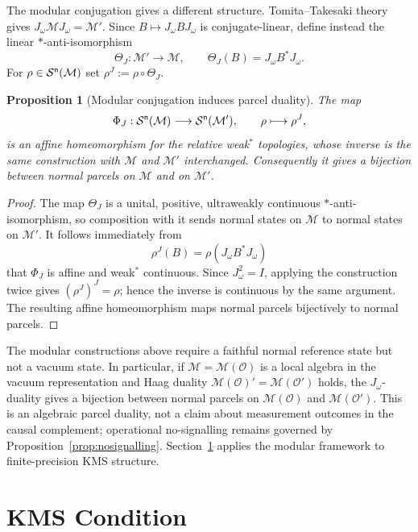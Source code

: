 \documentclass[11pt]{article}
\newtheorem{proposition}[theorem]{Proposition}
\begin{document}
The modular conjugation gives a different structure. Tomita--Takesaki
theory gives $J_\omega\mathcal M J_\omega=\mathcal M'$. Since
$B\mapsto J_\omega BJ_\omega$ is conjugate-linear, define instead the
linear $*$-anti-isomorphism
\[
\Theta_J:\mathcal M'\longrightarrow\mathcal M,
\qquad
\Theta_J(B)=J_\omega B^*J_\omega.
\]
For $\rho\in\mathcal S^{\sf n}(\mathcal M)$ set
$\rho^J:=\rho\circ\Theta_J$.

\begin{proposition}[Modular conjugation induces parcel duality]
\label{prop:Jparcel}
The map
\[
\Phi_J:\mathcal S^{\sf n}(\mathcal M)
\longrightarrow
\mathcal S^{\sf n}(\mathcal M'),
\qquad
\rho\longmapsto\rho^J,
\]
is an affine homeomorphism for the relative weak$^*$ topologies, whose
inverse is the same construction with $\mathcal M$ and $\mathcal M'$
interchanged. Consequently it gives a bijection between normal parcels on
$\mathcal M$ and on $\mathcal M'$.
\end{proposition}

\begin{proof}
The map $\Theta_J$ is a unital, positive, ultraweakly continuous
$*$-anti-isomorphism, so composition with it sends normal states on
$\mathcal M$ to normal states on $\mathcal M'$. It follows immediately
from
\[
\rho^J(B)=\rho(J_\omega B^*J_\omega)
\]
that $\Phi_J$ is affine and weak$^*$ continuous. Since $J_\omega^2=I$,
applying the construction twice gives $(\rho^J)^J=\rho$; hence the inverse
is continuous by the same argument. The resulting affine homeomorphism
maps normal parcels bijectively to normal parcels.
\end{proof}

The modular constructions above require a faithful normal reference state
but not a vacuum state. In particular, if $\mathcal M=\mathcal M(\mathcal
O)$ is a local algebra in the vacuum representation and Haag duality
$\mathcal M(\mathcal O)'=\mathcal M(\mathcal O')$ holds, the
$J_\omega$-duality gives a bijection between normal parcels on
$\mathcal M(\mathcal O)$ and $\mathcal M(\mathcal O')$. This is an
algebraic parcel duality, not a claim about measurement outcomes in the
causal complement; operational no-signalling remains governed by
Proposition~\ref{prop:nosignalling}. Section~\ref{sec:kms} applies the
modular framework to finite-precision KMS structure.
\section{KMS Condition}
\label{sec:kms}
\end{document}
